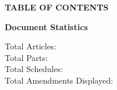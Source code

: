 
{}

\begin{center}
{\LARGE \textbf{TABLE OF CONTENTS}}
\end{center}

\vspace{1cm}

\tableofcontents

\vspace{2cm}

\if@draftmode
\begin{center}
{\large \textbf{Document Statistics}}
\end{center}

\vspace{0.5cm}

\noindent
Total Articles: \thetotalarticles \\
Total Parts: \thepartcounter \\  
Total Schedules: \theschedulecounter \\
Total Amendments Displayed: \thetotalamendments \\

\vspace{1cm}
\fi

\cleardoublepage